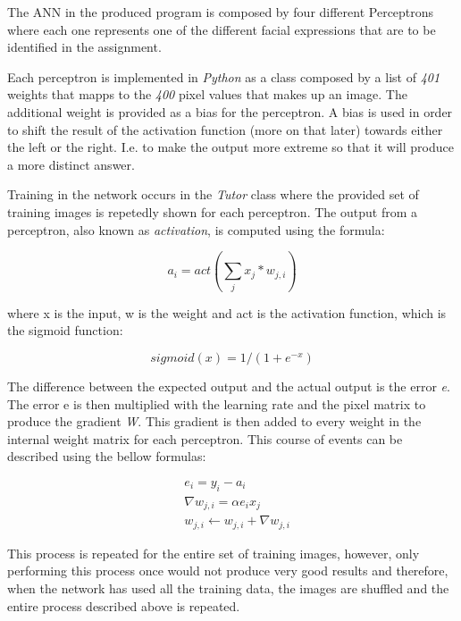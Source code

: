 \documentclass[12pt]{article}
\begin{document}
The ANN in the produced program is composed by four different Perceptrons
where each one represents one of the different facial expressions that are
to be identified in the assignment.

Each perceptron is implemented in \textit{Python} as a class composed by a
list of \textit{401} weights that mapps to the \textit{400} pixel values
that makes up an image. The additional weight is provided as a bias for
the perceptron. A bias is used in order to shift the result of the activation
function (more on that later) towards either the left or the right. I.e.
to make the output more extreme so that it will produce a more distinct
answer.

Training in the network occurs in the \textit{Tutor} class where the provided
set of training images is repetedly shown for each perceptron. The output
from a perceptron, also known as \textit{activation}, is computed using
the formula:

\begin{equation*}
  a_i = act(\sum_j x_j*w_{j,i})
\end{equation*}

where x is the input, w is the weight and act is the activation function,
which is the sigmoid function:

\begin{equation*}
sigmoid(x) = 1/(1+e^{-x})
\end{equation*}


The difference between the expected output and the actual output is the
error \textit{e}. The error e is then multiplied with the learning rate \alpha
and the pixel matrix to produce the gradient \textit{\nabla W}. This
gradient is then added to every weight in the internal weight matrix for each
perceptron. This course of events can be described using the bellow formulas:

\begin{align*}
  &e_i = y_i - a_i\\
  &\nabla w_{j,i} = \alpha e_ix_j\\
  &w_{j,i} \leftarrow w_{j,i} + \nabla w_{j,i}
\end{align*}

This process is repeated for the entire set of training images, however,
only performing this process once would not produce very good results and
therefore, when the network has used all the training data, the images
are shuffled and the entire process described above is repeated.
\end{document}
